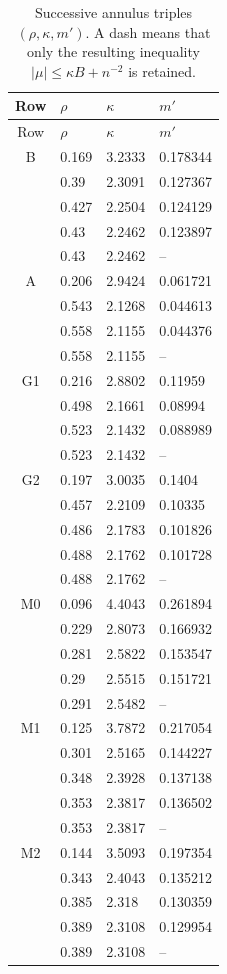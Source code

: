 \begin{longtable}{@{}clll@{}}
\caption{Successive annulus triples $(\rho,\kappa,m')$.
A dash means that only the resulting inequality $|\mu|\leq\kappa B+n^{-2}$ is retained.}
\label{bc:annulus-table}\\
\toprule Row&$\rho$&$\kappa$&$m'$\\\midrule\endfirsthead
\toprule Row&$\rho$&$\kappa$&$m'$\\\midrule\endhead
B & 0.169 & 3.2333 & 0.178344\\
 & 0.39 & 2.3091 & 0.127367\\
 & 0.427 & 2.2504 & 0.124129\\
 & 0.43 & 2.2462 & 0.123897\\
 & 0.43 & 2.2462 & --\\
A & 0.206 & 2.9424 & 0.061721\\
 & 0.543 & 2.1268 & 0.044613\\
 & 0.558 & 2.1155 & 0.044376\\
 & 0.558 & 2.1155 & --\\
G1 & 0.216 & 2.8802 & 0.11959\\
 & 0.498 & 2.1661 & 0.08994\\
 & 0.523 & 2.1432 & 0.088989\\
 & 0.523 & 2.1432 & --\\
G2 & 0.197 & 3.0035 & 0.1404\\
 & 0.457 & 2.2109 & 0.10335\\
 & 0.486 & 2.1783 & 0.101826\\
 & 0.488 & 2.1762 & 0.101728\\
 & 0.488 & 2.1762 & --\\
M0 & 0.096 & 4.4043 & 0.261894\\
 & 0.229 & 2.8073 & 0.166932\\
 & 0.281 & 2.5822 & 0.153547\\
 & 0.29 & 2.5515 & 0.151721\\
 & 0.291 & 2.5482 & --\\
M1 & 0.125 & 3.7872 & 0.217054\\
 & 0.301 & 2.5165 & 0.144227\\
 & 0.348 & 2.3928 & 0.137138\\
 & 0.353 & 2.3817 & 0.136502\\
 & 0.353 & 2.3817 & --\\
M2 & 0.144 & 3.5093 & 0.197354\\
 & 0.343 & 2.4043 & 0.135212\\
 & 0.385 & 2.318 & 0.130359\\
 & 0.389 & 2.3108 & 0.129954\\
 & 0.389 & 2.3108 & --\\
\bottomrule\end{longtable}
